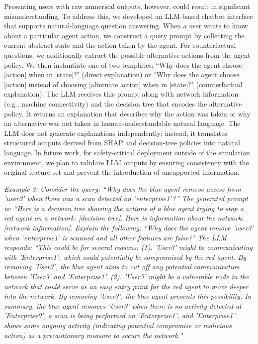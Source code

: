 Presenting users with raw numerical outputs, however, could result in significant misunderstanding.
To address this, we developed an LLM-based chatbot interface that supports natural-language question answering. 
When a user wants to know about a particular agent action, we construct a query prompt by collecting the current abstract state and the action taken by the agent. 
For counterfactual questions, we additionally extract the possible alternative actions from the agent policy.
We then instantiate one of two templates: ``Why does the agent choose [action] when in [state]?" (direct explanation) or ``Why does the agent choose [action] instead of choosing [alternate action] when in [state]?" (counterfactual explanation).
The LLM receives this prompt along with network information (e.g., machine connectivity) and the decision tree that encodes the alternative policy. 
It returns an explanation that describes why the action was taken or why an alternative was not taken in human-understandable natural language. The LLM does not generate explanations independently; instead, it translates structured outputs derived from SHAP and decision-tree policies into natural language.
In future work, for safety-critical deployment outside of the simulation environment, we plan to validate LLM outputs by ensuring consistency with the original feature set and prevent the introduction of unsupported information.

\textit{Example 3: Consider the query: ``Why does the blue agent remove access from 'user3' when there was a scan detected on 'enterprise1'?” The generated prompt is: ``Here is a decision tree showing the actions of a blue agent trying to stop a red agent on a network: [decision tree]. Here is information about the network: [network information]. Explain the following: ``Why does the agent remove 'user3' when 'enterprise1' is scanned and all other features are false?" The LLM responds: ``This could be for several reasons: (1). 'User3' might be communicating with 'Enterprise1', which could potentially be compromised by the red agent. By removing 'User3', the blue agent aims to cut off any potential communication between 'User3' and 'Enterprise1'. (2). 'User3' might be a vulnerable node in the network that could serve as an easy entry point for the red agent to move deeper into the network. By removing 'User3', the blue agent prevents this possibility. In summary, the blue agent removes 'User3' when there is no activity detected at 'Enterprise0', a scan is being performed on 'Enterprise1', and 'Enterprise1' shows some ongoing activity (indicating potential compromise or malicious action) as a precautionary measure to secure the network."}
